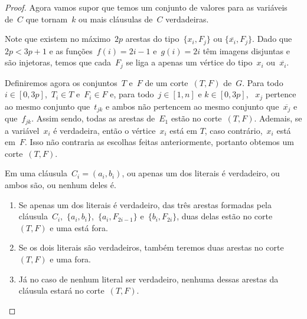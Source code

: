 \begin{proof}
		
		\bigskip
		\bigskip

		Agora vamos supor que temos um conjunto de valores para 
		as variáveis de~$C$ que tornam~$k$ ou mais cláusulas
		de~$C$ verdadeiras.

		Note que existem no máximo~$2p$ arestas do 
		tipo~${\{x_i,F_j\}}$ ou ${\{\overline{x_i},F_j\}}$. 
		Dado que~${2p<3p+1}$ e
		as funções~${f(i)=2i - 1}$ e~${g(i)=2i}$ têm 
		imagens disjuntas e são injetoras, 
		temos que cada~$F_j$ se liga a apenas um vértice
		do tipo~$x_i$ ou~${\overline{x_i}}$.

		Definiremos agora os
		conjuntos~$T$ e~$F$ de um corte~$(T,F)$ de~$G$.
		Para todo~${i\in[0,3p]}$,~${T_i\in T}$ 
		e~${F_i\in F}$ e,
		para todo~${j\in[1,n]}$ e ${k\in[0,3p]}$, ~$x_j$ pertence ao 
		mesmo conjunto que~$t_{jk}$ e ambos não pertencem ao mesmo 
		conjunto que~$\overline{x_j}$ e que~$f_{jk}$.
		Assim sendo, todas as arestas de~$E_1$ estão no 
		corte~$(T,F)$.
		Ademais, se a variável~$x_i$ é verdadeira,
		então o vértice~$x_i$ está em $T$, caso contrário,~$x_i$
		está em~$F$.
		Isso não contraria as escolhas feitas anteriormente, portanto 
		obtemos um corte~$(T,F)$.

		Em uma cláusula~${C_i=(a_i,b_i)}$, ou
		apenas um dos literais é verdadeiro, ou ambos são, ou nenhum
		deles é.
		\begin{enumerate}
			\item Se apenas um dos literais é verdadeiro,
			das três arestas formadas pela 
			cláusula~$C_i$,~$\{a_i,b_i\}$,~$\{a_i, F_{2i-1}\}$
			e~$\{b_i, F_{2i}\}$, duas delas
			estão no corte~$(T,F)$ e uma está fora.
			\item Se os dois literais são verdadeiros, também teremos
			duas arestas no corte~$(T,F)$ e uma fora.
			\item Já no caso de nenhum literal ser verdadeiro, nenhuma
			dessas arestas da cláusula estará no corte~$(T,F)$.
		\end{enumerate}


\end{proof}
